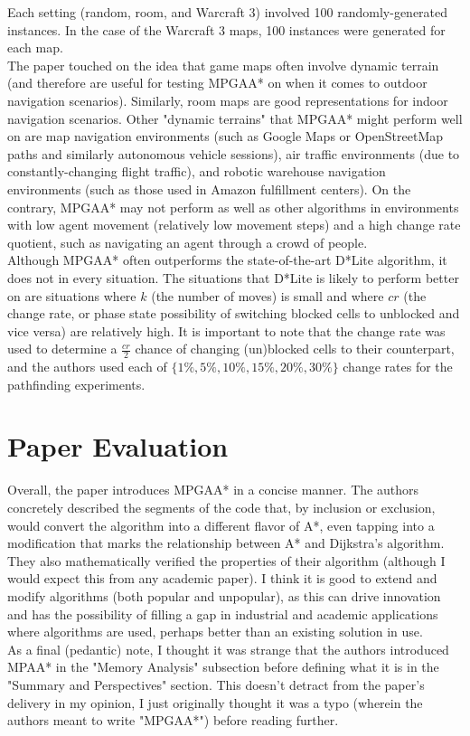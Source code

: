 \documentclass{article}
\begin{document}
Each setting (random, room, and Warcraft 3) involved 100 randomly-generated instances. In the case of the Warcraft 3 maps, 100 instances were generated for each map. \\

The paper touched on the idea that game maps often involve dynamic terrain (and therefore are useful for testing MPGAA* on when it comes to outdoor navigation scenarios). Similarly, room maps are good representations for indoor navigation scenarios. Other "dynamic terrains" that MPGAA* might perform well on are map navigation environments (such as Google Maps or OpenStreetMap paths and similarly autonomous vehicle sessions), air traffic environments (due to constantly-changing flight traffic), and robotic warehouse navigation environments (such as those used in Amazon fulfillment centers). On the contrary, MPGAA* may not perform as well as other algorithms in environments with low agent movement (relatively low movement steps) and a high change rate quotient, such as navigating an agent through a crowd of people. \\

Although MPGAA* often outperforms the state-of-the-art D*Lite algorithm, it does not in every situation. The situations that D*Lite is likely to perform better on are situations where $k$ (the number of moves) is small and where $cr$ (the change rate, or phase state possibility of switching blocked cells to unblocked and vice versa) are relatively high. It is important to note that the change rate was used to determine a $\frac{cr}{2}$ chance of changing (un)blocked cells to their counterpart, and the authors used each of $\{1\%,5\%,10\%,15\%,20\%,30\%\}$ change rates for the pathfinding experiments.

\section{Paper Evaluation}
Overall, the paper introduces MPGAA* in a concise manner. The authors concretely described the segments of the code that, by inclusion or exclusion, would convert the algorithm into a different flavor of A*, even tapping into a modification that marks the relationship between A* and Dijkstra's algorithm. They also mathematically verified the properties of their algorithm (although I would expect this from any academic paper). I think it is good to extend and modify algorithms (both popular and unpopular), as this can drive innovation and has the possibility of filling a gap in industrial and academic applications where algorithms are used, perhaps better than an existing solution in use. \\

As a final (pedantic) note, I thought it was strange that the authors introduced MPAA* in the "Memory Analysis" subsection before defining what it is in the "Summary and Perspectives" section. This doesn't detract from the paper's delivery in my opinion, I just originally thought it was a typo (wherein the authors meant to write "MPGAA*") before reading further.
\end{document}
